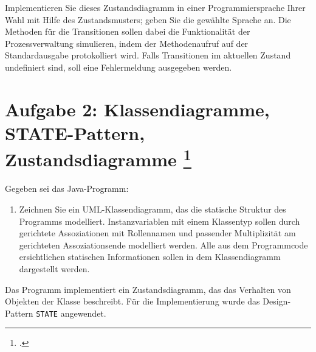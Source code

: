 \documentclass{lehramt-informatik}
\begin{document}
\noindent
Implementieren Sie dieses Zustandsdiagramm in einer Programmiersprache
Ihrer Wahl mit Hilfe des Zustandsmusters; geben Sie die gewählte Sprache
an. Die Methoden für die Transitionen sollen dabei die Funktionalität
der Prozessverwaltung simulieren, indem der Methodenaufruf auf der
Standardausgabe protokolliert wird. Falls Transitionen im aktuellen
Zustand undefiniert sind, soll eine Fehlermeldung ausgegeben werden.

\begin{antwort}
\end{antwort}

%

\section{Aufgabe 2: Klassendiagramme, STATE-Pattern, Zustandsdiagramme
\footcite{examen:66116:2018:09}}

Gegeben sei das Java-Programm:


\begin{enumerate}


\item Zeichnen Sie ein UML-Klassendiagramm, das die statische Struktur
des Programms modelliert. Instanzvariablen mit einem Klassentyp sollen
durch gerichtete Assoziationen mit Rollennamen und passender
Multiplizität am gerichteten Assoziationsende modelliert werden. Alle
aus dem Programmcode ersichtlichen statischen Informationen sollen in
dem Klassendiagramm dargestellt werden.

\end{enumerate}

\noindent
Das Programm implementiert ein Zustandsdiagramm, das das
Verhalten von Objekten der Klasse  beschreibt. Für die
Implementierung wurde das Design-Pattern \texttt{STATE} angewendet.
\end{document}
